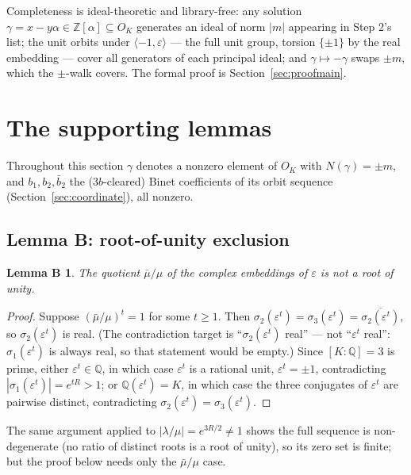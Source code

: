 \documentclass[11pt]{amsart}
\theoremstyle{plain}
\newtheorem*{lemmaB}{Lemma B}
\theoremstyle{remark}
\begin{document}
Completeness is ideal-theoretic and library-free: any solution
$\gamma = x - y\alpha \in \mathbb{Z}[\alpha] \subseteq O_K$ generates
an ideal of norm $|m|$ appearing in Step 2's list; the unit orbits
under $\langle -1, \varepsilon\rangle$ --- the full unit group,
torsion $\{\pm1\}$ by the real embedding --- cover all generators of
each principal ideal; and $\gamma \mapsto -\gamma$ swaps $\pm m$,
which the $\pm$-walk covers. The formal proof is
Section~\ref{sec:proofmain}.

\section{The supporting lemmas}\label{sec:lemmas}

Throughout this section $\gamma$ denotes a nonzero element of $O_K$
with $N(\gamma) = \pm m$, and $b_1, b_2, \bar b_2$ the ($3b$-cleared)
Binet coefficients of its orbit sequence
(Section~\ref{sec:coordinate}), all nonzero.

\subsection{Lemma B: root-of-unity exclusion}\label{sec:lemB}

\begin{lemmaB}
The quotient $\bar\mu/\mu$ of the complex embeddings of $\varepsilon$
is not a root of unity.
\end{lemmaB}

\begin{proof}
Suppose $(\bar\mu/\mu)^t = 1$ for some $t \ge 1$. Then
$\sigma_2(\varepsilon^t) = \sigma_3(\varepsilon^t) =
\overline{\sigma_2(\varepsilon^t)}$, so $\sigma_2(\varepsilon^t)$ is
real. (The contradiction target is ``$\sigma_2(\varepsilon^t)$ real''
--- not ``$\varepsilon^t$ real'': $\sigma_1(\varepsilon^t)$ is always
real, so that statement would be empty.) Since $[K:\mathbb{Q}] = 3$
is prime, either $\varepsilon^t \in \mathbb{Q}$, in which case
$\varepsilon^t$ is a rational unit, $\varepsilon^t = \pm 1$,
contradicting $|\sigma_1(\varepsilon^t)| = e^{tR} > 1$; or
$\mathbb{Q}(\varepsilon^t) = K$, in which case the three conjugates
of $\varepsilon^t$ are pairwise distinct, contradicting
$\sigma_2(\varepsilon^t) = \sigma_3(\varepsilon^t)$.
\end{proof}

The same argument applied to $|\lambda/\mu| = e^{3R/2} \ne 1$ shows
the full sequence is non-degenerate (no ratio of distinct roots is a
root of unity), so its zero set is finite; but the proof below needs
only the $\bar\mu/\mu$ case.
\end{document}
